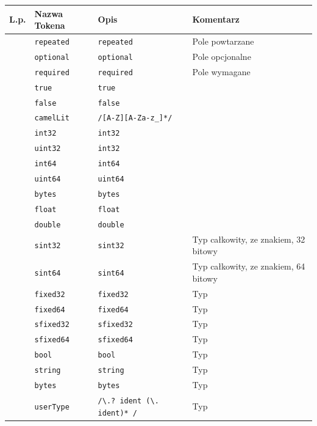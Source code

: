 \documentclass[a4paper]{article}
\begin{document}
\begin{center}
\begin{tabular}{| l | l | p{5cm} | p{5cm} |}
\hline
\textbf{L.p.} &  \textbf{Nazwa Tokena}            & \textbf{Opis}                                 & \textbf{Komentarz} \\ \hline
  & \verb`repeated` & \verb`repeated` & Pole powtarzane \\ \hline
  & \verb`optional` & \verb`optional` & Pole opcjonalne \\ \hline
  & \verb`required` & \verb`required` & Pole wymagane \\ \hline
  & \verb`true` & \verb`true` & \\ \hline
  & \verb`false` & \verb`false` & \\ \hline
  & \verb`camelLit` & \verb`/[A-Z][A-Za-z_]*/` & \\ \hline
  & \verb`int32` & \verb`int32` & \\ \hline
  & \verb`uint32` & \verb`int32` & \\ \hline
  & \verb`int64` & \verb`int64` & \\ \hline
  & \verb`uint64` & \verb`uint64` & \\ \hline
  & \verb`bytes` & \verb`bytes` & \\ \hline
  & \verb`float` & \verb`float` & \\ \hline
  & \verb`double` & \verb`double` & \\ \hline
  & \verb`sint32` & \verb`sint32` & Typ całkowity, ze znakiem, 32 bitowy \\ \hline
  & \verb`sint64` & \verb`sint64` & Typ całkowity, ze znakiem, 64 bitowy \\ \hline
  & \verb`fixed32` & \verb`fixed32` & Typ \\ \hline
  & \verb`fixed64` & \verb`fixed64` & Typ \\ \hline
  & \verb`sfixed32` & \verb`sfixed32` & Typ \\ \hline
  & \verb`sfixed64` & \verb`sfixed64` & Typ \\ \hline
  & \verb`bool` & \verb`bool` & Typ \\ \hline
  & \verb`string` & \verb`string` & Typ \\ \hline
  & \verb`bytes` & \verb`bytes` & Typ \\ \hline
  & \verb`userType` & \verb`/\.? ident (\. ident)* /` & Typ \\ \hline
\end{tabular}
\end{center}
\end{document}
